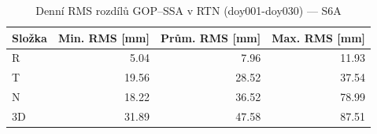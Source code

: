 \begin{table}[H]
\centering
\caption{Denní RMS rozdílů GOP–SSA v RTN (doy001-doy030) — S6A}
\label{tab:gop_vs_ssa_s6a_doy001-doy030_rms}
\begin{tabular}{lrrr}
\toprule
Složka & Min. RMS [mm] & Prům. RMS [mm] & Max. RMS [mm] \\
\midrule
R & 5.04 & 7.96 & 11.93 \\
T & 19.56 & 28.52 & 37.54 \\
N & 18.22 & 36.52 & 78.99 \\
3D & 31.89 & 47.58 & 87.51 \\
\bottomrule
\end{tabular}
\end{table}
